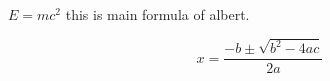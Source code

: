 \lipsum[2-2]
\\
$E = mc^2$ this is main formula of albert.

\begin{equation}
    x = \frac{-b\pm \sqrt{b^2-4ac}}{2a}
\end{equation}